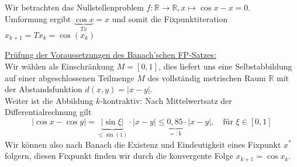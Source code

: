 \begin{egbox} 
    Wir betrachten das Nullstellenproblem $f:\mathbb{R}\rightarrow\mathbb{R}, x\mapsto \cos x - x = 0$. \\
    Umformung ergibt $\underbrace{\cos x}_{Tx} = x$ und somit die Fixpunktiteration $x_{k+1}=Tx_k=\cos(x_k)$ \\
    \begin{center}
    \end{center}
    \underline{Prüfung der Voraussetzungen des Banach'schen FP-Satzes:} \\
    Wir wählen als Einschränkung $M=[0,1]$, dies liefert uns eine Selbstabbildung auf einer abgeschlossenen 
    Teilmenge $M$ des vollständig metrischen Raum $\mathbb{R}$ mit der Abstandsfunktion $ d(x,y) = |x-y|$. \\
    Weiter ist die Abbildung $k$-kontraktiv:  Nach Mittelwertsatz der Differentialrechnung gilt 
    \[|\cos x - \cos y| = \underbrace{|\sin \xi|}_{\leq \sin(1)}\cdot|x-y|\leq \underbrace{0,85}_{=:k}\cdot |x-y|, 
    \quad \text{für } \xi\in[0,1]\]
    Wir können also nach Banach die Existenz und Eindeutigkeit eines Fixpunkt $x^*$ folgern, diesen Fixpunkt 
    finden wir durch die konvergente Folge $x_{k+1}=\cos x_k$. 
\end{egbox}
